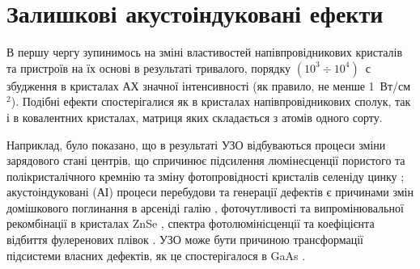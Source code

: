 
\section{Залишкові акустоіндуковані ефекти}

В першу чергу зупинимось на зміні властивостей напівпровідникових кристалів та пристроїв на їх основі в результаті тривалого, порядку $(10^3\div10^4)$~с збудження в кристалах АХ значної інтенсивності (як правило, не менше 1~Вт/см$^2$).
Подібні ефекти спостерігалися як в кристалах напівпровідникових сполук, так і в ковалентних кристалах, матриця яких складається з атомів одного сорту.



Наприклад, було показано, що в результаті УЗО відбуваються процеси зміни зарядового стані центрів, що спричинює підсилення люмінесценції пористого \cite{Bahar2003} та полікристалічного \cite{Ostap:PhotoLum} кремнію та
зміну фотопровідності кристалів селеніду цинку \cite{US:ZnSe};
акустоіндуковані (АІ) процеси перебудови та генерації дефектів є причинами змін
домішкового поглинання в арсеніді галію \cite{Zaver2007},
фоточутливості та випромінювальної рекомбінації в кристалах ZnSe \cite{ZobovFTP2008},
спектра фотолюмінісценції та коефіцієнта відбиття фулеренових плівок \cite{RITTER2008}.
УЗО може бути причиною трансформації підсистеми власних дефектів, як це спостерігалося в GaAs \cite{Wosinski}.

